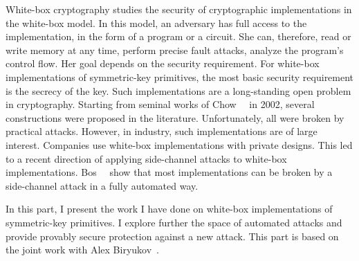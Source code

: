 White-box cryptography studies the security of cryptographic implementations in the white-box model. In this model, an adversary has full access to the implementation, in the form of a program or a circuit. She can, therefore, read or write memory at any time, perform precise fault attacks, analyze the program's control flow. Her goal depends on the security requirement. For white-box implementations of symmetric-key primitives, the most basic security requirement is the secrecy of the key. Such implementations are a long-standing open problem in cryptography. Starting from seminal works of Chow~\etal{}~\cite{ChowAES,ChowDES} in 2002, several constructions were proposed in the literature. Unfortunately, all were broken by practical attacks. However, in industry, such implementations are of large interest. Companies use white-box implementations with private designs. This led to a recent direction of applying side-channel attacks to white-box implementations. Bos~\etal{}~\cite{AttackBos} show that most implementations can be broken by a side-channel attack in a fully automated way.

In this part, I present the work I have done on white-box implementations of symmetric-key primitives. I explore further the space of automated attacks and provide provably secure protection against a new attack. This part is based on the joint work with Alex Biryukov~\cite{OurWhitebox}.